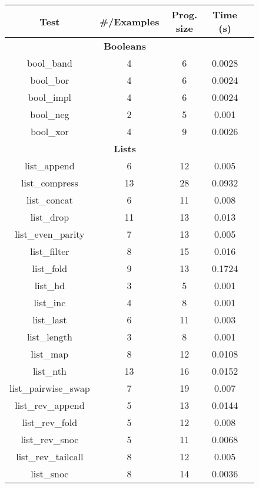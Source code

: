 \newcommand{\benchmarksCount}{ 42 }

\begin{figure}
  \begin{center}
  \tabcolsep 5.8pt
  \footnotesize
  \begin{tabular}{|c|c|c|c|c|}
  \hline
  \textbf{Test} & \textbf{ \#/Examples } & \textbf{ Prog. size } & \textbf{Time (s)} \\
  \hline

\multicolumn{4}{|c|}{\textbf{Booleans}} \\
\hline
bool\_band & 4 & 6 & 0.0028 \\
\hline
bool\_bor & 4 & 6 & 0.0024 \\
\hline
bool\_impl & 4 & 6 & 0.0024 \\
\hline
bool\_neg & 2 & 5 & 0.001 \\
\hline
bool\_xor & 4 & 9 & 0.0026 \\
\hline
\multicolumn{4}{|c|}{\textbf{Lists}} \\
\hline
list\_append & 6 & 12 & 0.005 \\
\hline
list\_compress & 13 & 28 & 0.0932 \\
\hline
list\_concat & 6 & 11 & 0.008 \\
\hline
list\_drop & 11 & 13 & 0.013 \\
\hline
list\_even\_parity & 7 & 13 & 0.005 \\
\hline
list\_filter & 8 & 15 & 0.016 \\
\hline
list\_fold & 9 & 13 & 0.1724 \\
\hline
list\_hd & 3 & 5 & 0.001 \\
\hline
list\_inc & 4 & 8 & 0.001 \\
\hline
list\_last & 6 & 11 & 0.003 \\
\hline
list\_length & 3 & 8 & 0.001 \\
\hline
list\_map & 8 & 12 & 0.0108 \\
\hline
list\_nth & 13 & 16 & 0.0152 \\
\hline
list\_pairwise\_swap & 7 & 19 & 0.007 \\
\hline
list\_rev\_append & 5 & 13 & 0.0144 \\
\hline
list\_rev\_fold & 5 & 12 & 0.008 \\
\hline
list\_rev\_snoc & 5 & 11 & 0.0068 \\
\hline
list\_rev\_tailcall & 8 & 12 & 0.005 \\
\hline
list\_snoc & 8 & 14 & 0.0036 \\
\hline

\end{tabular}
\end{center}
\end{figure}
